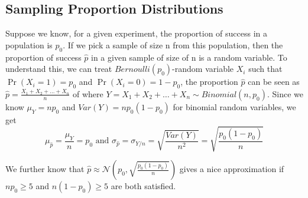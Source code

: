 \documentclass{ximera}
\begin{document}
\subsection*{Sampling Proportion Distributions}
Suppose we know, for a given experiment, the proportion of success in a population is $p_0$. If we pick a sample of size n from this population, then the proportion of success $\hat p$ in a given sample of size of  n is a random variable. To understand this, we can treat $Bernoulli(p_0)$-random variable $X_i$ such that $\Pr(X_i=1)=p_0$ and $\Pr(X_i=0)=1-p_0$, the proportion $\hat p$ can be seen as $\hat p=\frac{X_1+X_2+\ldots+X_n}{n}$ of where $Y=X_1+X_2+\ldots+X_n\sim Binomial(n,p_0)$.  Since we know $\mu_Y=np_0$ and $Var(Y)=np_0(1-p_0)$ for binomial random variables, we get 
$$\mu_{\hat p}=\frac{\mu_Y}{n}=p_0 \mbox{ and } \sigma_{\hat p}=\sigma_{Y/n}=\sqrt{\frac{Var(Y)}{n^2}}=\sqrt{\frac{p_0(1-p_0)}{n}}$$

We further know that $\hat p\approx \mathcal N(p_0,\sqrt{\frac{p_0(1-p_0)}{n}})$ gives a nice approximation if $np_0\geq 5$ and $n(1-p_0)\geq 5$ are both satisfied. 
\end{document}
